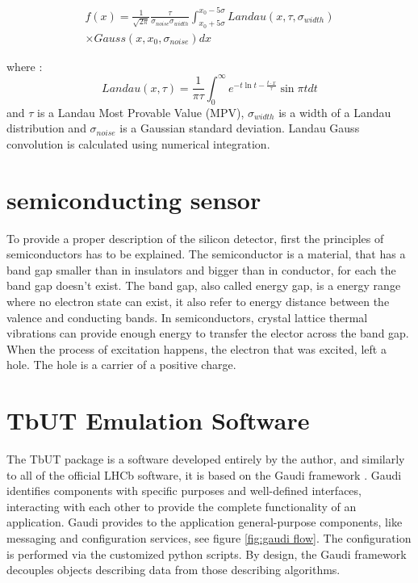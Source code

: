 \begin{equation}
    \begin{split}
    f(x) = \frac{1}{\sqrt{2 \pi}} \frac{\tau}{\sigma_{noise} \sigma_{width}} \int_{x_0+5\sigma}^{x_0-5\sigma} Landau(x, \tau, \sigma_{width}) \\ \times Gauss (x, x_0,\sigma_{noise}) dx
    \end{split}
\end{equation}

where :
\begin{equation}
    Landau(x,\tau) =  \frac{1}{\pi \tau} \int_{0}^{\infty} e^{-t \ln t - \frac{t \cdot x}{\tau}} \sin{\pi t} dt
\end{equation}
and $\tau$ is a Landau Most Provable Value (MPV), $\sigma_{width}$ is a width of a Landau distribution and $\sigma_{noise}$ is a Gaussian standard deviation. Landau Gauss convolution is calculated using numerical integration. 


\section{semiconducting sensor}
To provide a proper description of the silicon detector, first the principles of semiconductors has to be explained. 
The semiconductor is a material, that has a band gap smaller than in insulators and bigger than in conductor, for each the band gap doesn't exist. The band gap, also called energy gap, is a energy range where no electron state can exist, it also refer to energy distance between the valence and conducting bands. In semiconductors, crystal lattice thermal vibrations can provide enough energy to transfer the elector across the band gap. When the process of excitation happens, the electron that was excited, left a hole. The hole is a carrier of a positive charge. 


\section{TbUT Emulation Software}
\label{chapter:tbut}
The TbUT package is a software developed entirely by the author, and similarly to all of the official LHCb software, it is based on the Gaudi framework \cite{gaudi}. Gaudi identifies components with specific purposes and well-defined interfaces, interacting with each other to provide the complete functionality of an application. Gaudi provides to the application general-purpose components, like messaging and configuration services, see figure \ref{fig:gaudi flow}. The configuration is performed via the customized python scripts. By design, the Gaudi framework decouples objects describing data from those describing algorithms.



